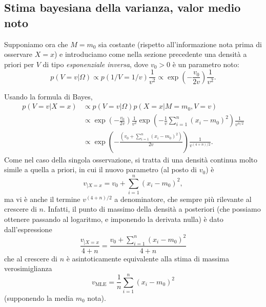 \documentclass[
  italian,
  letterpaper,
]{book}
\newcommand{\bra}[1]{\left( #1 \right)}
\newcommand{\mle}{\operatorname{MLE}}
\theoremstyle{definition}
\theoremstyle{remark}
\begin{document}
\subsection{Stima bayesiana della varianza, valor medio
noto}\label{stima-bayesiana-della-varianza-valor-medio-noto}

Supponiamo ora che \(M =m_0\) sia costante (rispetto all'informazione
nota prima di osservare \(X=x\)) e introduciamo come nella sezione
precedente una densità a priori per \(V\) di tipo \emph{esponenziale
inversa}, dove \(v_0>0\) è un parametro noto:
\[ p( V = v|\Omega)  \propto p(1/V = 1/v)\frac{1}{v^2} \propto \exp\bra{ -\frac{v_0}{2v}}\frac{1}{v^2}.\]

Usando la formula di Bayes,
\[ \begin{split} p(V=v| X=x) & \propto p(V=v|\Omega ) p(X =x | M=m_0, V=v) \\
& \propto \exp\bra{ - \frac{v_0}{2v} } \frac 1 {v^2} \exp\bra{ - \frac{1}{v} \sum_{i=1}^n (x_i-m_0)^2} \frac{1}{v^{n/2}}\\
&\propto\exp\bra{ - \frac{ \bra{v_0 + \sum_{i=1}^n (x_i-m_0)^2} } {2v}} \frac{1}{v^{(4+n)/2}}.\end{split}\]
Come nel caso della singola osservazione, si tratta di una densità
continua molto simile a quella a priori, in cui il nuovo parametro (al
posto di \(v_0\)) è \[ v_{|X=x} = v_0 + \sum_{i=1}^n (x_i-m_0)^2,\] ma
vi è anche il termine \(v^{(4+n)/2}\) a denominatore, che sempre più
rilevante al crescere di \(n\). Infatti, il punto di massimo della
densità a posteriori (che possiamo ottenere passando al logaritmo, e
imponendo la derivata nulla) è dato dall'espressione
\[ \frac{ v_{|X=x}}{4+n} =  \frac{ v_0 + \sum_{i=1}^n (x_i-m_0)^2}{4+n }\]
che al crescere di \(n\) è asintoticamente equivalente alla stima di
massima verosimiglianza
\[v_{{\mle}} = \frac{1}{n} \sum_{i=1}^n (x_i-m_0)^2\] (supponendo la
media \(m_0\) nota).
\end{document}
